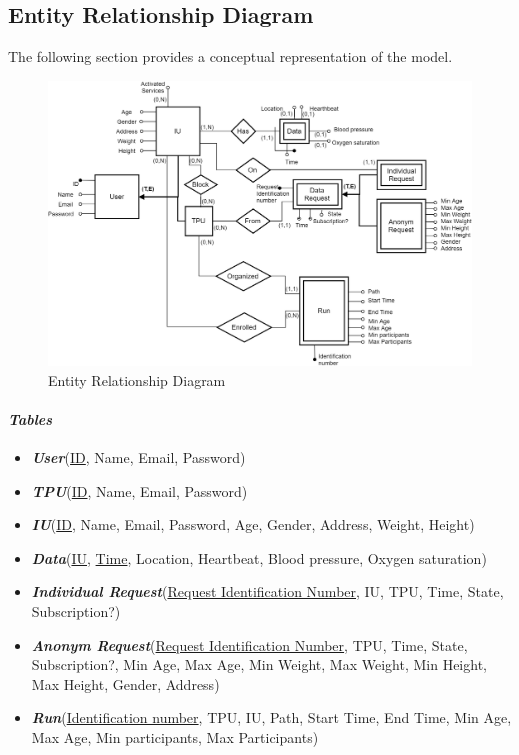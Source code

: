 \subsection{Entity Relationship Diagram}
The following section provides a conceptual representation of the model.
\begin{figure}[H]
\caption{Entity Relationship Diagram}
\centering
\includegraphics[width = \textwidth]{sections/architecturalDesign/entityRelationshipDiagram.png}
\end{figure}
\paragraph{\textit{Tables}} 
\begin{itemize}
\item \textbf{\textit{User}}(\underline{ID}, Name, Email, Password)
\item \textbf{\textit{TPU}}(\underline{ID}, Name, Email, Password)
\item \textbf{\textit{IU}}(\underline{ID}, Name, Email, Password, Age, Gender, Address, Weight, Height)
\item \textbf{\textit{Data}}(\underline{IU}, \underline{Time}, Location, Heartbeat, Blood pressure, Oxygen saturation)
\\
\item \textbf{\textit{Individual Request}}(\underline{Request Identification Number}, IU, TPU, Time, State, Subscription?)
\item \textbf{\textit{Anonym Request}}(\underline{Request Identification Number}, TPU, Time, State, Subscription?, Min Age, Max Age, Min Weight, Max Weight, Min Height, Max Height, Gender, Address)
\\
\item \textbf{\textit{Run}}(\underline{Identification number}, TPU, IU, Path, Start Time, End Time, Min Age, Max Age, Min participants, Max Participants)
\end{itemize}

